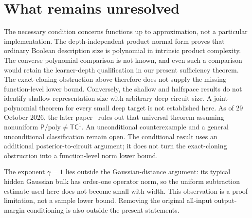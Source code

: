 \documentclass[11pt]{article}
\begin{document}










\section{What remains unresolved}

The necessary condition concerns functions up to approximation, not a
particular implementation. The depth-independent product normal form
proves that ordinary Boolean description size is polynomial in intrinsic
product complexity. The converse polynomial comparison is not known,
and even such a comparison would retain the learner-depth qualification
in our present sufficiency theorem. The exact-cloning obstruction above therefore
does not supply the missing function-level lower bound. Conversely,
the shallow and halfspace results do not identify shallow representation
size with arbitrary deep circuit size. A joint polynomial theorem for
every small deep target is not established here. As of 29 October 2026,
the later paper~\cite{conditional2026} rules out that universal theorem
assuming nonuniform $\mathsf P/\mathrm{poly}\ne\mathsf{TC}^1$.
An unconditional counterexample and a general unconditional classification
remain open. The conditional result uses an additional posterior-to-circuit
argument; it does not turn the exact-cloning obstruction into a
function-level norm lower bound.

The exponent $\gamma=1$ lies outside the Gaussian-distance argument:
its typical hidden Gaussian bulk has order-one operator norm, so the
uniform subtraction estimate used here does not become small with width.
This observation is a proof limitation, not a sample lower bound.
Removing the original all-input output-margin conditioning is also
outside the present statements.
\end{document}
